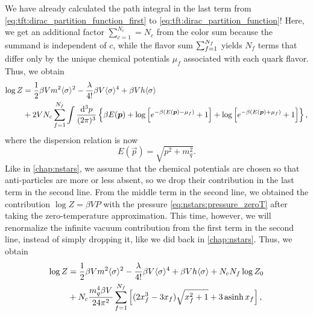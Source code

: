 We have already calculated the path integral in the last term from \cref{eq:tft:dirac_partition_function_first} to \cref{eq:tft:dirac_partition_function}!
Here, we get an additional factor $\sum_{c=1}^{N_c} = N_c$ from the color sum because the summand is independent of $c$,
while the flavor sum $\sum_{f=1}^{\smash{N_f}}$ yields $N_f$ terms that differ only by the unique chemical potentials $\mu_f$ associated with each quark flavor. 
Thus, we obtain
\begin{equation}
\begin{split}
	\log Z &= \frac12 \beta V m^2 \langle \sigma \rangle^2 - \frac{\lambda}{4!} \beta V \langle \sigma \rangle^4 + \beta V h \langle \sigma \rangle \\
	       &+ 2 V N_c \sum_{f=1}^{N_f} \int \frac{\mathop{}\!\mathrm{d}^3 p}{(2 \pi)^3} \left\{ \beta E({\bm{p}}) + \log \left[ e^{-\beta (E({\bm{p}}) - \mu_f)}+1 \right] + \log \left[ e^{-\beta (E({\bm{p}}) + \mu_f)} + 1\right] \right\} ,
\end{split}
\label{eq:lsm:potential_divergent_logz0}
\end{equation}
where the dispersion  relation is now
\begin{equation}
	E(\vec{p}) = \sqrt{p^2 + m_q^2} .
\end{equation}
Like in \cref{chap:nstars}, we assume that the chemical potentials are chosen so that anti-particles are more or less absent, so we drop their contribution in the last term in the second line.
From the middle term in the second line, we obtained the contribution $\log Z = \beta V P$ with the pressure \eqref{eq:nstars:pressure_zeroT} after taking the zero-temperature approximation.
This time, however, we will renormalize the infinite vacuum contribution from the first term in the second line, instead of simply dropping it, like we did back in \cref{chap:nstars}.
Thus, we obtain
\begin{equation}
\begin{split}
	\log Z &= \frac12 \beta V m^2 \langle \sigma \rangle^2 - \frac{\lambda}{4!} \beta V \langle \sigma \rangle^4 + \beta V h \langle \sigma \rangle + N_c N_f \log Z_0 \\
	       &+ N_c \frac{m_q^4 \beta V}{24 \pi^2} \sum_{f=1}^{N_f} \left[ (2 x_f^3 - 3x_f) \sqrt{x_f^2 + 1} + 3 \operatorname{asinh} x_f \right],
\end{split}
\end{equation}
